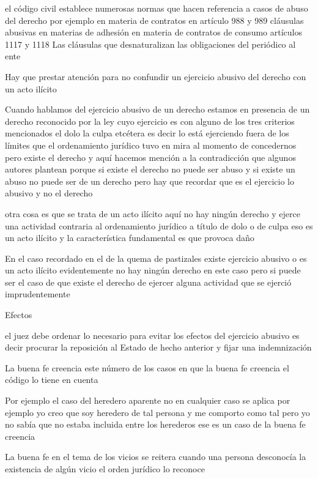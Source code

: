 \documentclass[12pt]{book}
\begin{document}
el código civil establece numerosas normas que hacen referencia a casos de abuso del derecho por ejemplo en materia de contratos en artículo 988 y 989 cláusulas abusivas en materias de adhesión en materia de contratos de consumo artículos
1117 y 1118
Las cláusulas que desnaturalizan las obligaciones del periódico al ente

Hay que prestar atención para no confundir un ejercicio abusivo del derecho con un acto ilícito

Cuando hablamos del ejercicio abusivo de un derecho estamos en presencia de un derecho reconocido por la ley cuyo ejercicio es con alguno de los tres criterios mencionados el dolo la culpa etcétera es decir lo está ejerciendo fuera de los límites que el ordenamiento jurídico tuvo en mira al momento de concedernos pero existe el derecho y aquí hacemos mención a la contradicción que algunos autores plantean porque si existe el derecho no puede ser abuso y si existe un abuso no puede ser de un derecho pero hay que recordar que es el ejercicio lo abusivo y no el derecho

otra cosa es que se trata de un acto ilícito aquí no hay ningún derecho y ejerce una actividad contraria al ordenamiento jurídico a título de dolo o de culpa eso es un acto ilícito y la característica fundamental es que provoca daño

En el caso recordado en el de la quema de pastizales existe ejercicio abusivo o es un acto ilícito evidentemente no hay ningún derecho en este caso pero si puede ser el caso de que existe el derecho de ejercer alguna actividad que se ejerció imprudentemente





Efectos

el juez debe ordenar lo necesario para evitar los efectos del ejercicio abusivo es decir procurar la reposición al Estado de hecho anterior y fijar una indemnización

La buena fe creencia
este número de los casos en que la buena fe creencia el código lo tiene en cuenta

Por ejemplo el caso del heredero aparente no en cualquier caso se aplica por ejemplo yo creo que soy heredero de tal persona y me comporto como tal pero yo no sabía que no estaba incluida entre los herederos ese es un caso de la buena fe creencia

La buena fe en el tema de los vicios se reitera cuando una persona desconocía la existencia de algún vicio el orden jurídico lo reconoce
\end{document}
